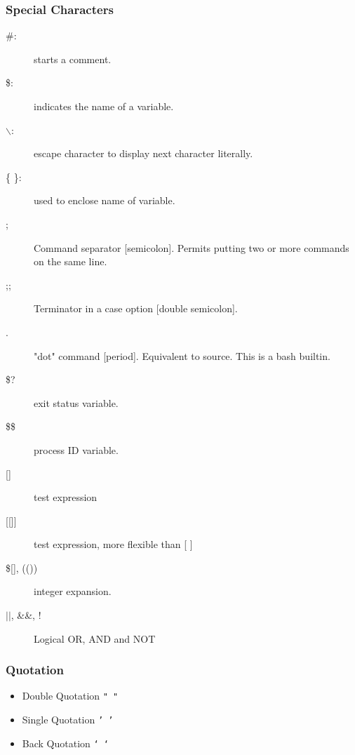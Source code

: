 \documentclass[10pt,t]{beamer}
\newcommand{\Verblubrown}[1]{\Verb[formatcom=\color{lubrown},fontseries=b,commandchars=\\\{\}]|#1|}
\newcommand{\Verbblue}[2][b]{\Verb[formatcom=\color{lublue},fontshape=#1,commandchars=\\\{\}]|#2|}
\begin{document}
\begin{frame}
  \frametitle{Special Characters}
  \begin{description}
    \item[\#:] starts a comment.
    \item[\$:] indicates the name of a variable.
    \item[$\backslash$:] escape character to display next character literally.
    \item[\{ \}:] used to enclose name of variable.
    \item[;] Command separator [semicolon]. Permits putting two or more commands on the same line.
    \item[;;] Terminator in a case option [double semicolon].
    \item[.] "dot" command [period]. Equivalent to source. This is a bash builtin.
    \item[\$?] exit status variable.
    \item[\$\$] process ID variable.
    \item[{[\quad]}] test expression
    \item[{[[\quad]]}] test expression, more flexible than [ ]
    \item[{\$[\quad], ((\quad))}] integer expansion.
    \item[{$||$, \&\&, !}] Logical OR, AND and NOT
  \end{description}
\end{frame}

\begin{frame}[fragile]
  \frametitle{Quotation}
  \begin{itemize}
    \item Double Quotation \texttt{" "}
    \item Single Quotation \texttt{' '}
    \item Back Quotation \texttt{` `}
  \end{itemize}
\end{frame}
\end{document}
